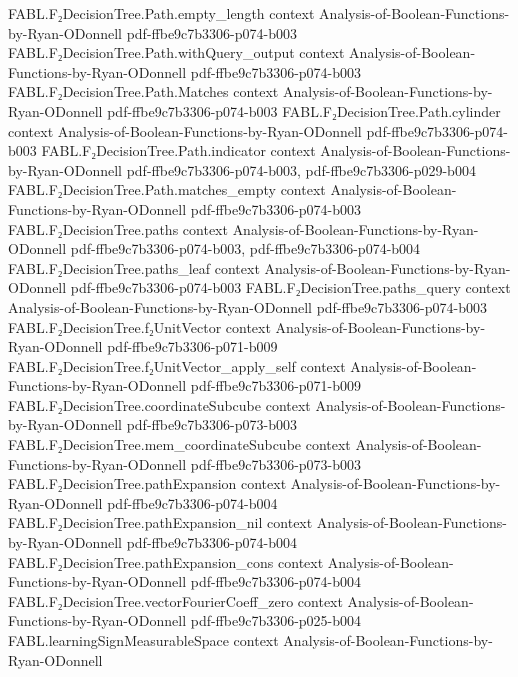 \begin{theorem}
\proofstep
  {FABL.F₂DecisionTree.Path.empty_length}
  {context}
  {Analysis-of-Boolean-Functions-by-Ryan-ODonnell}
  {pdf-ffbe9c7b3306-p074-b003}
\proofstep
  {FABL.F₂DecisionTree.Path.withQuery_output}
  {context}
  {Analysis-of-Boolean-Functions-by-Ryan-ODonnell}
  {pdf-ffbe9c7b3306-p074-b003}
\proofstep
  {FABL.F₂DecisionTree.Path.Matches}
  {context}
  {Analysis-of-Boolean-Functions-by-Ryan-ODonnell}
  {pdf-ffbe9c7b3306-p074-b003}
\proofstep
  {FABL.F₂DecisionTree.Path.cylinder}
  {context}
  {Analysis-of-Boolean-Functions-by-Ryan-ODonnell}
  {pdf-ffbe9c7b3306-p074-b003}
\proofstep
  {FABL.F₂DecisionTree.Path.indicator}
  {context}
  {Analysis-of-Boolean-Functions-by-Ryan-ODonnell}
  {pdf-ffbe9c7b3306-p074-b003,
    pdf-ffbe9c7b3306-p029-b004}
\proofstep
  {FABL.F₂DecisionTree.Path.matches_empty}
  {context}
  {Analysis-of-Boolean-Functions-by-Ryan-ODonnell}
  {pdf-ffbe9c7b3306-p074-b003}
\proofstep
  {FABL.F₂DecisionTree.paths}
  {context}
  {Analysis-of-Boolean-Functions-by-Ryan-ODonnell}
  {pdf-ffbe9c7b3306-p074-b003,
    pdf-ffbe9c7b3306-p074-b004}
\proofstep
  {FABL.F₂DecisionTree.paths_leaf}
  {context}
  {Analysis-of-Boolean-Functions-by-Ryan-ODonnell}
  {pdf-ffbe9c7b3306-p074-b003}
\proofstep
  {FABL.F₂DecisionTree.paths_query}
  {context}
  {Analysis-of-Boolean-Functions-by-Ryan-ODonnell}
  {pdf-ffbe9c7b3306-p074-b003}
\proofstep
  {FABL.F₂DecisionTree.f₂UnitVector}
  {context}
  {Analysis-of-Boolean-Functions-by-Ryan-ODonnell}
  {pdf-ffbe9c7b3306-p071-b009}
\proofstep
  {FABL.F₂DecisionTree.f₂UnitVector_apply_self}
  {context}
  {Analysis-of-Boolean-Functions-by-Ryan-ODonnell}
  {pdf-ffbe9c7b3306-p071-b009}
\proofstep
  {FABL.F₂DecisionTree.coordinateSubcube}
  {context}
  {Analysis-of-Boolean-Functions-by-Ryan-ODonnell}
  {pdf-ffbe9c7b3306-p073-b003}
\proofstep
  {FABL.F₂DecisionTree.mem_coordinateSubcube}
  {context}
  {Analysis-of-Boolean-Functions-by-Ryan-ODonnell}
  {pdf-ffbe9c7b3306-p073-b003}
\proofstep
  {FABL.F₂DecisionTree.pathExpansion}
  {context}
  {Analysis-of-Boolean-Functions-by-Ryan-ODonnell}
  {pdf-ffbe9c7b3306-p074-b004}
\proofstep
  {FABL.F₂DecisionTree.pathExpansion_nil}
  {context}
  {Analysis-of-Boolean-Functions-by-Ryan-ODonnell}
  {pdf-ffbe9c7b3306-p074-b004}
\proofstep
  {FABL.F₂DecisionTree.pathExpansion_cons}
  {context}
  {Analysis-of-Boolean-Functions-by-Ryan-ODonnell}
  {pdf-ffbe9c7b3306-p074-b004}
\proofstep
  {FABL.F₂DecisionTree.vectorFourierCoeff_zero}
  {context}
  {Analysis-of-Boolean-Functions-by-Ryan-ODonnell}
  {pdf-ffbe9c7b3306-p025-b004}
\proofstep
  {FABL.learningSignMeasurableSpace}
  {context}
  {Analysis-of-Boolean-Functions-by-Ryan-ODonnell}

\end{theorem}

